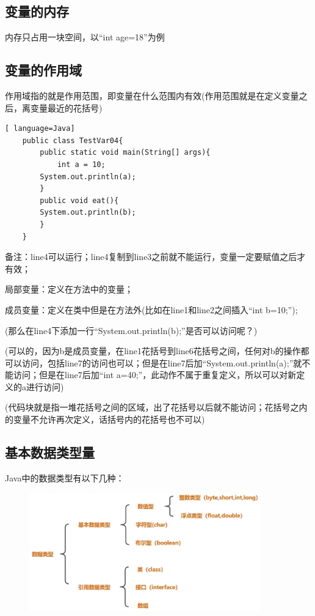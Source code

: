 \documentclass{article}
\begin{document}
	\setlength{\parindent}{2em}
	
	\subsection{变量的内存}
	
	内存只占用一块空间，以“int age=18”为例
	
	\subsection{变量的作用域}
	
	作用域指的就是作用范围，即变量在什么范围内有效(作用范围就是在定义变量之后，离变量最近的花括号)
	
	\begin{lstlisting}[ language=Java]
	public class TestVar04{
		public static void main(String[] args){
			int a = 10;
		System.out.println(a);
		}
		public void eat(){
		System.out.println(b);
		}
	}
	\end{lstlisting}
	
	备注：line4可以运行；line4复制到line3之前就不能运行，变量一定要赋值之后才有效；
	
	局部变量：定义在方法中的变量；
	
	成员变量：定义在类中但是在方法外(比如在line1和line2之间插入“int b=10;”);
	
	(那么在line4下添加一行“System.out.println(b);”是否可以访问呢？)

	(可以的，因为b是成员变量，在line1花括号到line6花括号之间，任何对b的操作都可以访问，包括line7的访问也可以；但是在line7后加“System.out.println(a);”就不能访问；但是在line7后加“int a=40;”，此动作不属于重复定义，所以可以对新定义的a进行访问)
	
	(代码块就是指一堆花括号之间的区域，出了花括号以后就不能访问；花括号之内的变量不允许再次定义，话括号内的花括号也不可以)	
	
	\subsection{基本数据类型量}
	
	Java中的数据类型有以下几种：
	
	\begin{figure}[ht]
		\centering
		\includegraphics[width=100mm]{06.png}
		\label{fig:label}
	\end{figure}
	
\end{document}
